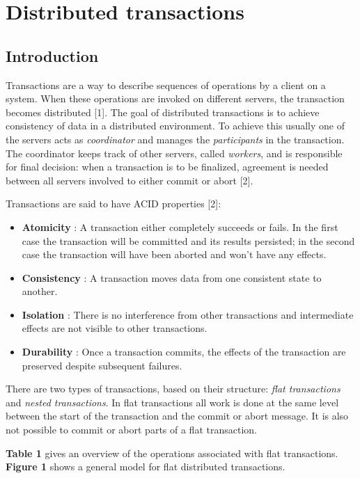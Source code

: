\chapter{Distributed transactions}



\section{Introduction}

Transactions are a way to describe sequences of operations by a client on a system. When these operations are invoked on different servers, the transaction becomes distributed [1]. The goal of distributed transactions is to achieve consistency of data in a distributed environment. To achieve this usually one of the servers acts as \emph{coordinator} and manages the \emph{participants} in the transaction. The coordinator keeps track of other servers, called \emph{workers}, and is responsible for final decision: when a transaction is to be finalized, agreement is needed between all servers involved to either commit or abort [2].

Transactions are said to have ACID properties [2]:
\begin{itemize}
	\item \textbf{Atomicity} : A transaction either completely succeeds or fails. In the first case the transaction will be committed and its results persisted; in the second case the transaction will have been aborted and won't have any effects.
	\item \textbf{Consistency} : A transaction moves data from one consistent state to another.
	\item \textbf{Isolation} : There is no interference from other transactions and intermediate effects are not visible to other transactions.
	\item \textbf{Durability} : Once a transaction commits, the effects of the transaction are preserved despite subsequent failures.
\end{itemize}

There are two types of transactions, based on their structure: \emph{flat transactions} and \emph{nested transactions}. In flat transactions all work is done at the same level between the start of the transaction and the commit or abort message. It is also not possible to commit or abort parts of a flat transaction.

\textbf{Table 1} gives an overview of the operations associated with flat transactions. \textbf{Figure 1} shows a general model for flat distributed transactions.

